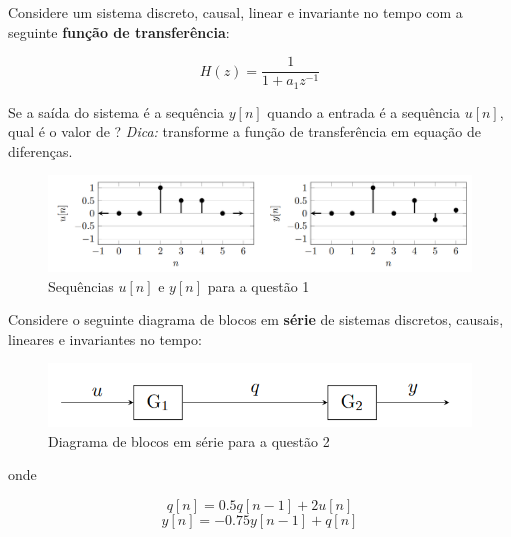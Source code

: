 \documentclass{yagoexam}
\begin{document}
\begin{questions}
	
	\question[15]
	Considere um sistema discreto, causal, linear e invariante no tempo com a seguinte \textbf{função de transferência}:
	
	$$H(z) = \dfrac{1}{1+a_1z^{-1}}$$
	
	Se a saída do sistema é a sequência $y[n]$
	quando a entrada é a sequência $u[n]$, qual é o valor de ? \textit{Dica:} transforme a função de transferência em equação de diferenças.
	
	  \begin{figure}[h]
	\caption{\label{q1}Sequências $u[n]$ e $y[n]$ para a questão 1}
	\begin{center}
		\includegraphics[scale=1]{q1.PNG}
	\end{center}
    \end{figure} 
    
    \newpage
    
    \question[10]
    Considere o seguinte diagrama de blocos em \textbf{série} de sistemas discretos, causais, lineares e invariantes no tempo:
    
	  \begin{figure}[h]
	\caption{\label{q2}Diagrama de blocos em série para a questão 2}
	\begin{center}
		\includegraphics[scale=1]{q2.PNG}
	\end{center}
    \end{figure}
    
    onde
    
    $$q[n] = 0.5q[n - 1] + 2u[n]$$
    $$y[n] = -0.75y[n - 1] + q[n]$$
    
    \vspace{0.5cm}
    
\end{questions}
\end{document}

